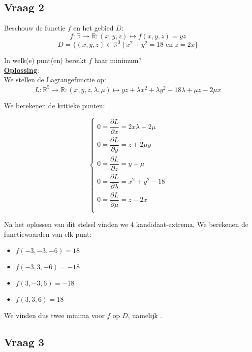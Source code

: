\documentclass[kulak]{kulakarticle} %
\newcommand{\R}{\mathbb{R}}
\renewcommand{\boxed}[1]{\text{\fboxsep=.3em\fbox{#1}}}
\begin{document}
	\newpage

	\subsection*{Vraag 2}

	Beschouw de functie \(f\) en het gebied \(D\): \[ f : \R \to \R : (x,y,z) \mapsto f(x,y,z) = yz \]\[ D = \{ (x,y,z) \in \R^3 \mid x^2+y^2=18 \text{ en } z=2x \} \]

	In welk(e) punt(en) bereikt \(f\) haar minimum? \\

	\textbf{\underline{Oplossing}}: \\

	We stellen de Lagrangefunctie op: \[ L : \R^5\to\R : (x,y,z,\lambda,\mu) \mapsto yz + \lambda x^2 +\lambda y^2 - 18 \lambda + \mu z - 2 \mu x \]

	We berekenen de kritieke punten:

	\renewcommand{\arraystretch}{2}
	\[ \left\{
	\begin{array}{l}
		0 = \dfrac{\partial L}{\partial x} = 2x \lambda -2\mu \\
		0 = \dfrac{\partial L}{\partial y} = z + 2\mu y \\
		0 = \dfrac{\partial L}{\partial z} = y + \mu \\
		0 = \dfrac{\partial L}{\partial \lambda} = x^2+y^2-18 \\
		0 = \dfrac{\partial L}{\partial \mu} = z - 2x \\
	\end{array}
	\right. \]

	Na het oplossen van dit stelsel vinden we 4 kandidaat-extrema. We berekenen de functiewaarden van elk punt:
	\begin{itemize}
		\item \(f(-3,-3,-6)=18\)
		\item \(f(-3,3,-6)=-18\)
		\item \(f(3,-3,6)=-18\)
		\item \(f(3,3,6)=18\)
	\end{itemize}

	We vinden dus twee minima voor \(f\) op \(D\), namelijk \boxed{\((-3,3,-6)\) en \((3,-3,6)\)}.

	\newpage

	\subsection*{Vraag 3}
\end{document}

